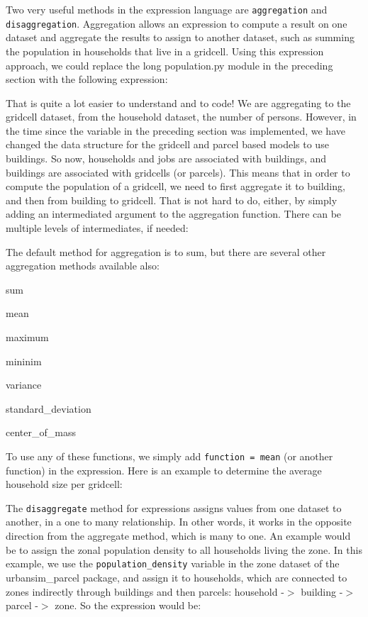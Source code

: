 Two very useful methods in the expression language are \verb#aggregation# and \verb#disaggregation#.  Aggregation allows an expression to compute a result on one dataset and aggregate the results to assign to another dataset, such as summing the population in households that live in a gridcell.  Using this expression approach, we could replace the long population.py module in the preceding section with the following expression:


That is quite a lot easier to understand and to code!  We are aggregating to the gridcell dataset, from the household dataset, the number of persons.  However, in the time since the variable in the preceding section was implemented, we have changed the data structure for the gridcell and parcel based models to use buildings.  So now, households and jobs are associated with buildings, and buildings are associated with gridcells (or parcels).  This means that in order to compute the population of a gridcell, we need to first aggregate it to building, and then from building to gridcell.  That is not hard to do, either, by simply adding an intermediated argument to the aggregation function.  There can be multiple levels of intermediates, if needed:


The default method for aggregation is to sum, but there are several other aggregation methods available also:

\squishlist
\item sum
\item mean
\item maximum
\item mininim
\item variance
\item standard\_deviation
\item center\_of\_mass
\squishend

To use any of these functions, we simply add \verb#function = mean# (or another function) in the expression.  Here is an example to determine the average household size per gridcell:


The \verb#disaggregate# method for expressions assigns values from one dataset to another, in a one to many relationship.  In other words, it works in the opposite direction from the aggregate method, which is many to one.  An example would be to assign the zonal population density to all households living the zone.  In this example, we use the \verb#population_density# variable in the zone dataset of the urbansim\_parcel package, and assign it to households, which are connected to zones indirectly through buildings and then parcels: household -$>$ building -$>$ parcel -$>$ zone.  So the expression would be:

